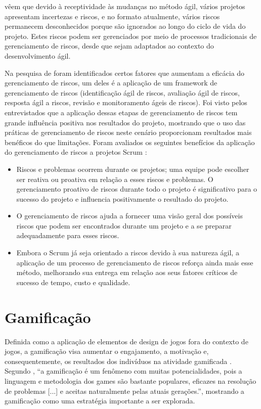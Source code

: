 \documentclass[
	12pt,
	openright,
	twoside,
	a4paper,
	english,
	brazil
	]{abntex2}
\begin{document}
 vêem que devido à receptividade às mudanças no método ágil, vários projetos apresentam incertezas e riscos, e no formato atualmente, vários riscos permanecem desconhecidos porque são ignorados ao longo do ciclo de vida do projeto. Estes riscos podem ser gerenciados por meio de processos tradicionais de gerenciamento de riscos, desde que sejam adaptados ao contexto do desenvolvimento ágil.

Na pesquisa de  foram identificados certos fatores que aumentam a eficácia do gerenciamento de riscos, um deles é a aplicação de um framework de gerenciamento de riscos (identificação ágil de riscos, avaliação ágil de riscos, resposta ágil a riscos, revisão e monitoramento ágeis de riscos). Foi visto pelos entrevistados que a aplicação dessas etapas de gerenciamento de riscos tem grande influência positiva nos resultados do projeto, mostrando que o uso das práticas de gerenciamento de riscos neste cenário proporcionam resultados mais benéficos do que limitações. Foram avaliados os seguintes benefícios da aplicação do gerenciamento de riscos a projetos Scrum \cite{Gold}:
\begin{itemize}
  \item Riscos e problemas ocorrem durante os projetos; uma equipe pode escolher ser reativa ou proativa em relação a esses riscos e problemas. O gerenciamento proativo de riscos durante todo o projeto é significativo para o sucesso do projeto e influencia positivamente o resultado do projeto.
  \item O gerenciamento de riscos ajuda a fornecer uma visão geral dos possíveis riscos que podem ser encontrados durante um projeto e a se preparar adequadamente para esses riscos.
  \item Embora o Scrum já seja orientado a riscos devido à sua natureza ágil, a aplicação de um processo de gerenciamento de riscos reforça ainda mais esse método, melhorando sua entrega em relação aos seus fatores críticos de sucesso de tempo, custo e qualidade.
\end{itemize}


\section{Gamificação}

Definida como a aplicação de elementos de design de jogos fora do contexto de jogos, a gamificação visa aumentar o engajamento, a motivação e, consequentemente, os resultados dos indivíduos na atividade gamificada \cite{GARCIA201721}. Segundo , “a gamificação é um fenômeno com muitas potencialidades, pois a linguagem e metodologia dos games são bastante populares, eficazes na resolução de problemas [...] e aceitas naturalmente pelas atuais gerações.”, mostrando a gamificação como uma estratégia importante a ser explorada.
\end{document}
